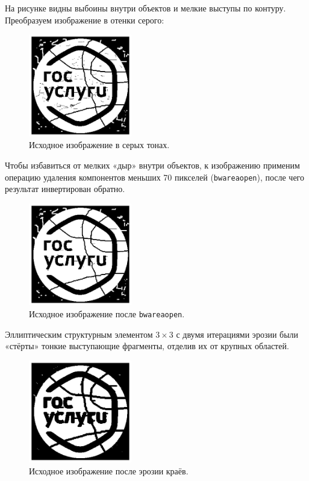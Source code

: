 \documentclass[a4paper,12pt]{article}
\begin{document}
На рисунке видны выбоины внутри объектов и мелкие выступы по контуру.
Преобразуем изображение в отенки серого:

\begin{figure}[H]
    \centering
    \includegraphics[width=0.4\textwidth]{result/1_grayscale.png}
    \caption{Исходное изображение в серых тонах.}
\end{figure}
  
Чтобы избавиться от мелких «дыр» внутри объектов, к изображению применим операцию удаления компонентов меньших 70 пикселей (\texttt{bwareaopen}), после чего результат инвертирован обратно.

\begin{figure}[H]
    \centering
    \includegraphics[width=0.4\textwidth]{result/1_beware_inside.png}
    \caption{Исходное изображение после \texttt{bwareaopen}.}
\end{figure}

Эллиптическим структурным элементом \(3\times3\) с двумя итерациями эрозии были «стёрты» тонкие выступающие фрагменты, отделив их от крупных областей.

\begin{figure}[H]
    \centering
    \includegraphics[width=0.4\textwidth]{result/1_erosion.png}
    \caption{Исходное изображение после эрозии краёв.}
\end{figure}
\end{document}
